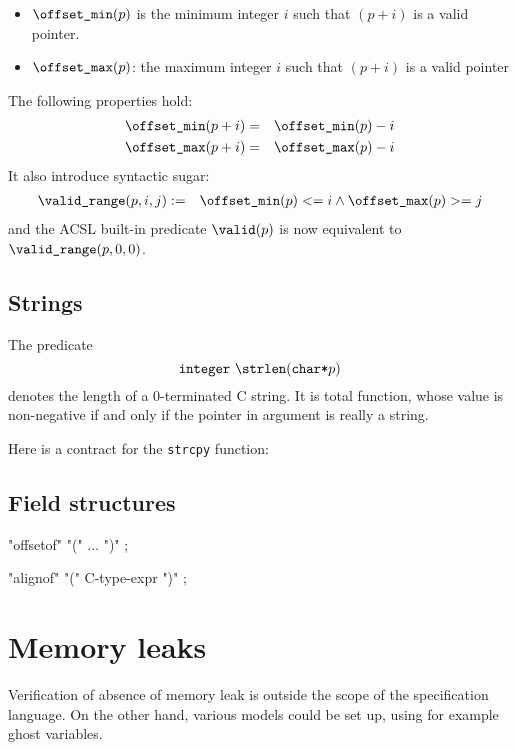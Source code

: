 \begin{itemize}
\item $\texttt{{\textbackslash}offset\_min}(p)$ is the minimum integer $i$ such that $(p+i)$ is a
  valid pointer.

\item $\texttt{{\textbackslash}offset\_max}(p)$: the maximum integer $i$ such that $(p+i)$ is a
  valid pointer
\end{itemize}
The following properties hold:
\begin{eqnarray*}
\texttt{{\textbackslash}offset\_min}(p+i) &=& \texttt{{\textbackslash}offset\_min}(p)-i \\
\texttt{{\textbackslash}offset\_max}(p+i) &=& \texttt{{\textbackslash}offset\_max}(p)-i
\end{eqnarray*}
It also introduce syntactic sugar:
\begin{eqnarray*}
\texttt{{\textbackslash}valid\_range}(p,i,j) &:=& \texttt{{\textbackslash}offset\_min}(p) <= i \land \texttt{{\textbackslash}offset\_max}(p) >= j
\end{eqnarray*}
and the ACSL built-in predicate $\texttt{{\textbackslash}valid}(p)$ is now equivalent to
$\texttt{{\textbackslash}valid\_range}(p,0,0)$.

\subsection{Strings}

\experimental

The predicate
\[
\integer~\strlen(\verb|char*|p)
\]
denotes the length of a 0-terminated C string. It is total function,
whose value is non-negative if and only if the pointer in argument is
really a string.

\begin{example}
  Here is a contract for the \verb|strcpy| function:
  

\end{example}

\subsection{Field structures}

 "offsetof" "(" ... ")" ; \experimental

 "alignof" "(" C-type-expr ")" ; \experimental

\section{Memory leaks}

\experimental

Verification of absence of memory leak is outside the scope of the
specification language. On the other hand, various models could be set
up, using for example ghost variables.

